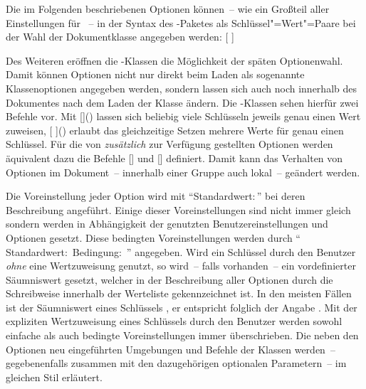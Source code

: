 Die im Folgenden beschriebenen Optionen können~-- wie ein Großteil aller 
Einstellungen für \KOMAScript~-- in der Syntax des -Paketes 
als Schlüssel"=Wert"=Paare bei der Wahl der Dokumentklasse angegeben werden:
[%
]

Des Weiteren eröffnen die \KOMAScript-Klassen die Möglichkeit der späten 
Optionenwahl. Damit können Optionen nicht nur direkt beim Laden als sogenannte 
Klassenoptionen angegeben werden, sondern lassen sich auch noch innerhalb des 
Dokumentes nach dem Laden der Klasse ändern. Die \KOMAScript-Klassen sehen 
hierfür zwei Befehle vor. Mit 
[]()
lassen sich beliebig viele Schlüsseln jeweils genau einen Wert zuweisen, 
[%
]()
erlaubt das gleichzeitige Setzen mehrere Werte für genau einen Schlüssel. 
Für die von \TUDScript \emph{zusätzlich} zur Verfügung gestellten Optionen
werden äquivalent dazu die Befehle []
und [] definiert. 
Damit kann das Verhalten von Optionen im Dokument~-- innerhalb einer Gruppe 
auch lokal~-- geändert werden.

Die Voreinstellung jeder Option wird mit \enquote{Standardwert:\,} 
bei deren Beschreibung angeführt. Einige dieser Voreinstellungen sind nicht 
immer gleich sondern werden in Abhängigkeit der genutzten Benutzereinstellungen 
und Optionen gesetzt. Diese bedingten Voreinstellungen werden durch 
\enquote{%
  Standardwert:\,%
  \PValue{\,|\,}Bedingung:\,%
}
angegeben. Wird ein Schlüssel durch den Benutzer \emph{ohne} eine Wertzuweisung 
genutzt, so wird~-- falls vorhanden~-- ein vordefinierter Säumniswert gesetzt, 
welcher in der Beschreibung aller Optionen durch die~ 
Schreibweise innerhalb der Werteliste gekennzeichnet ist. In den meisten Fällen 
ist der Säumniswert eines Schlüssels , er entspricht folglich der 
Angabe . Mit der expliziten Wertzuweisung eines 
Schlüssels durch den Benutzer werden sowohl einfache als auch bedingte 
Voreinstellungen immer überschrieben. Die neben den Optionen neu eingeführten 
Umgebungen und Befehle der Klassen werden~-- gegebenenfalls zusammen mit den 
dazugehörigen optionalen Parametern~-- im gleichen Stil erläutert.



